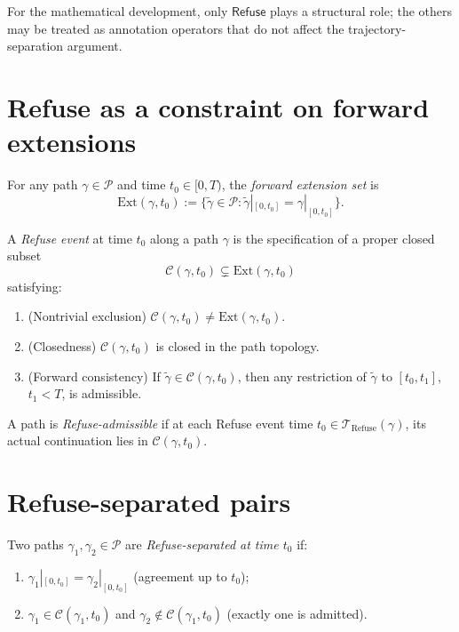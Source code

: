 \documentclass[12pt, oneside]{memoir}
\newcommand{\PP}{\mathcal{P}}
\begin{document}
For the mathematical development, only $\mathsf{Refuse}$ plays a structural role; the
others may be treated as annotation operators that do not affect the trajectory-separation
argument.

\section{Refuse as a constraint on forward extensions}

\begin{definition}
For any path $\gamma \in \PP$ and time $t_0 \in [0,T)$, the \emph{forward extension set}
is
\[
  \mathrm{Ext}(\gamma, t_0) :=
  \bigl\{ \tilde\gamma \in \PP : \tilde\gamma|_{[0,t_0]} = \gamma|_{[0,t_0]} \bigr\}.
\]
\end{definition}

\begin{definition}
\label{def:refuse}
A \emph{Refuse event} at time $t_0$ along a path $\gamma$ is the specification of a
proper closed subset
\[
  \mathcal{C}(\gamma, t_0) \subsetneq \mathrm{Ext}(\gamma, t_0)
\]
satisfying:
\begin{enumerate}
  \item\label{it:ref-nontrivial}
        (Nontrivial exclusion) $\mathcal{C}(\gamma,t_0) \ne \mathrm{Ext}(\gamma,t_0)$.
  \item\label{it:ref-closed}
        (Closedness) $\mathcal{C}(\gamma,t_0)$ is closed in the path topology.
  \item\label{it:ref-consistent}
        (Forward consistency) If $\tilde\gamma \in \mathcal{C}(\gamma,t_0)$, then any
        restriction of $\tilde\gamma$ to $[t_0, t_1]$, $t_1 < T$, is admissible.
\end{enumerate}
A path is \emph{Refuse-admissible} if at each Refuse event time $t_0 \in
\mathcal{T}_{\mathrm{Refuse}}(\gamma)$, its actual continuation lies in
$\mathcal{C}(\gamma, t_0)$.
\end{definition}

\section{Refuse-separated pairs}

\begin{definition}
\label{def:refuse-sep}
Two paths $\gamma_1, \gamma_2 \in \PP$ are \emph{Refuse-separated at time $t_0$} if:
\begin{enumerate}
  \item $\gamma_1|_{[0,t_0]} = \gamma_2|_{[0,t_0]}$ (agreement up to $t_0$);
  \item $\gamma_1 \in \mathcal{C}(\gamma_1, t_0)$ and
        $\gamma_2 \notin \mathcal{C}(\gamma_1, t_0)$ (exactly one is admitted).
\end{enumerate}
\end{definition}
\end{document}
